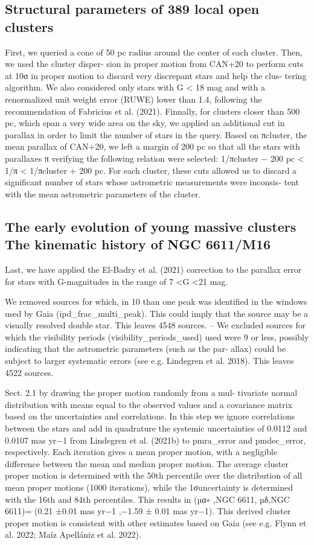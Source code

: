 \documentclass[../Main.tex]{subfiles}
\begin{document}
{\subsection{Structural parameters of 389 local open clusters} %
First, we queried a cone of 50 pc radius around the center of each cluster. Then, we used the cluster disper- sion in proper motion from CAN+20 to perform cuts at 10σ in proper motion to discard very discrepant stars and help the clus- tering algorithm. We also considered only stars with G < 18 mag and with a renormalized unit weight error (RUWE) lower than 1.4, following the recommendation of Fabricius et al. (2021). Finnally, for clusters closer than 500 pc, which span a very wide area on the sky, we applied an additional cut in parallax in order to limit the number of stars in the query. Based on πcluster, the mean parallax of CAN+20, we left a margin of 200 pc so that all the stars with parallaxes π verifying the following relation were selected: 1/πcluster − 200 pc < 1/π < 1/πcluster + 200 pc.
For each cluster, these cuts allowed us to discard a significant number of stars whose astrometric measurements were inconsis- tent with the mean astrometric parameters of the cluster.
\subsection{The early evolution of young massive clusters
The kinematic history of NGC 6611/M16}
Last, we have applied the El-Badry et al. (2021) correction to
the parallax error for stars with G-magnitudes in the range of
7 <G <21 mag.

We removed sources for which, in 10%
than one peak was identified in the windows used by Gaia
(ipd_frac_multi_peak). This could imply that the source
may be a visually resolved double star. This leaves 4548 sources.
– We excluded sources for which the visibility periods
(visibility_periods_used) used were 9 or less, possibly
indicating that the astrometric parameters (such as the par-
allax) could be subject to larger systematic errors (see e.g.
Lindegren et al. 2018). This leaves 4522 sources.

Sect. 2.1 by drawing the proper motion randomly from a mul-
tivariate normal distribution with means equal to the observed
values and a covariance matrix based on the uncertainties and
correlations. In this step we ignore correlations between the stars
and add in quadrature the systemic uncertainties of 0.0112 and
0.0107 mas yr−1 from Lindegren et al. (2021b) to pmra_error
and pmdec_error, respectively. Each iteration gives a mean
proper motion, with a negligible diﬀerence between the mean
and median proper motion. The average cluster proper motion is
determined with the 50th percentile over the distribution of all
mean proper motions (1000 iterations), while the 1σuncertainty
is determined with the 16th and 84th percentiles. This results
in (µα∗
,NGC 6611, µδ,NGC 6611)= (0.21 ±0.01 mas yr−1
,−1.59 ±
0.01 mas yr−1). This derived cluster proper motion is consistent
with other estimates based on Gaia (see e.g. Flynn et al. 2022;
Maíz Apellániz et al. 2022).

}
\end{document}
